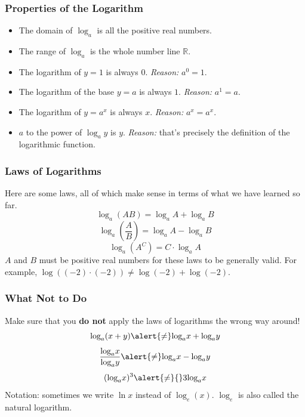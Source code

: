 \documentclass[xcolor=dvipsnames]{beamer}
\begin{document}
\begin{frame}
  \frametitle{Properties of the Logarithm}
  \begin{itemize}
  \item The domain of $\log_{a}$ is all the positive real numbers.
  \item The range of $\log_{a}$ is the whole number line $\mathbb{R}$.
  \item The logarithm of $y=1$ is always $0$. \emph{Reason:}
    $a^{0}=1$.
  \item The logarithm of the base $y=a$ is always $1$. \emph{Reason:}
    $a^{1}=a$.
  \item The logarithm of $y=a^{x}$ is always $x$. \emph{Reason:}
    $a^{x}=a^{x}$.
  \item $a$ to the power of $\log_{a}y$ is $y$. \emph{Reason:} that's
    precisely the definition of the logarithmic function.
  \end{itemize}
\end{frame}

\begin{frame}
  \frametitle{Laws of Logarithms}
Here are some laws, all of which make sense in terms of what we have
learned so far. 
\begin{equation}
  \label{eq:xeechahk}
\log_{a}(AB)=\log_{a}A+\log_{a}B
\end{equation}
\begin{equation}
  \label{eq:lahmophu}
\log_{a}\left(\frac{A}{B}\right)=\log_{a}A-\log_{a}B
\end{equation}
\begin{equation}
  \label{eq:ifohvoom}
\log_{a}(A^{C})=C\cdot \log_{a}A
\end{equation}
$A$ and $B$ must be positive real numbers for these laws to be
generally valid. For example, $\log((-2)\cdot(-2))\neq\log(-2)+\log(-2)$.
\end{frame}

\begin{frame}
  \frametitle{What Not to Do}
Make sure that you \textbf{do not} apply the laws of logarithms the
wrong way around!
\begin{equation}
  \label{eq:iotaegei}
\mbox{log}_{a}(x+y)\alert{\neq}\mbox{log}_{a}x+\mbox{log}_{a}y
\end{equation}
\begin{equation}
  \label{eq:phaamaje}
\frac{\mbox{log}_{a}x}{\mbox{log}_{a}y}\alert{\neq}\mbox{log}_{a}x-\mbox{log}_{a}y
\end{equation}
\begin{equation}
  \label{eq:luhaelae}
(\mbox{log}_{a}x)^{3}\alert{\neq}{}3\mbox{log}_{a}x
\end{equation}
Notation: sometimes we write $\ln{}x$ instead of $\log_{e}(x)$.
$\log_{e}$ is also called the \alert{natural logarithm}.
\end{frame}
\end{document}
